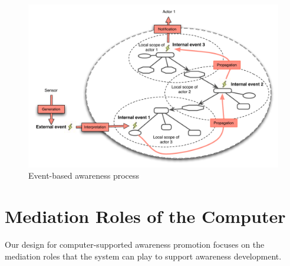 \begin{figure}[htbp] %
   \centering
   \includegraphics[width=5.5in]{event_process.pdf} 
   \caption{Event-based awareness process}
   \label{fig:event_process}
\end{figure}

\section{Mediation Roles of the Computer} %
\label{sec:mediation_roles_of_the_computer}

Our design for computer-supported awareness promotion focuses on the mediation roles that the system can play to support awareness development. 

